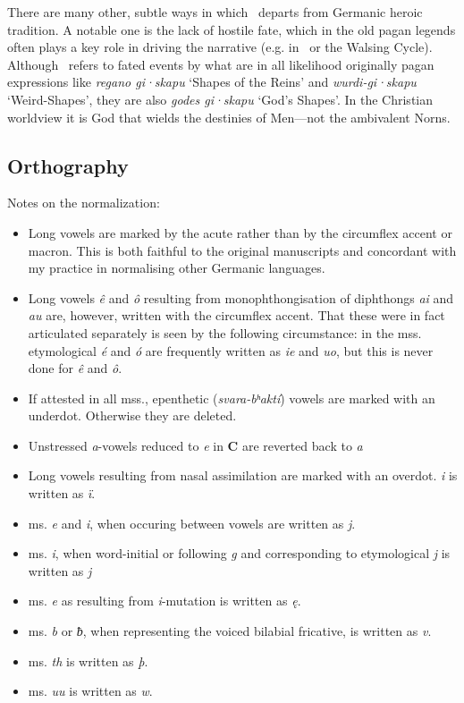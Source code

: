There are many other, subtle ways in which \Heliand\ departs from Germanic heroic tradition.  A notable one is the lack of hostile fate, which in the old pagan legends often plays a key role in driving the narrative (e.g. in \Hildebrandslied\ or the Walsing Cycle).  Although \Heliand\ refers to fated events by what are in all likelihood originally pagan expressions like \emph{regano gi·skapu} ‘Shapes of the Reins’ and \emph{wurdi-gi·skapu} ‘Weird-Shapes’, they are also \emph{godes gi·skapu} ‘God’s Shapes’.  In the Christian worldview it is God that wields the destinies of Men—not the ambivalent Norns.

\subsection{Orthography}

Notes on the normalization:
  \begin{itemize}
    \item Long vowels are marked by the acute rather than by the circumflex accent or macron. This is both faithful to the original manuscripts and concordant with my practice in normalising other Germanic languages.
    \item Long vowels \emph{ê} and \emph{ô} resulting from monophthongisation of diphthongs \emph{ai} and \emph{au} are, however, written with the circumflex accent. That these were in fact articulated separately is seen by the following circumstance: in the mss. etymological \emph{é} and \emph{ó} are frequently written as \emph{ie} and \emph{uo}, but this is never done for \emph{ê} and \emph{ô}.
    \item If attested in all mss., epenthetic (\emph{svara-bʰaktí}) vowels are marked with an underdot. Otherwise they are deleted.
    \item Unstressed \emph{a}-vowels reduced to \emph{e} in \textbf{C} are reverted back to \emph{a}
    \item Long vowels resulting from nasal assimilation are marked with an overdot. \emph{i} is written as \emph{ï}.
    \item ms. \emph{e} and \emph{i}, when occuring between vowels are written as \emph{j}.
    \item ms. \emph{i}, when word-initial or following \emph{g} and corresponding to etymological \emph{j} is written as \emph{j}
    \item ms. \emph{e} as resulting from \emph{i}-mutation is written as \emph{ę}.
    \item ms. \emph{b} or \emph{ƀ}, when representing the voiced bilabial fricative, is written as \emph{v}.
    \item ms. \emph{th} is written as \emph{þ}.
    \item ms. \emph{uu} is written as \emph{w}.
  \end{itemize}

